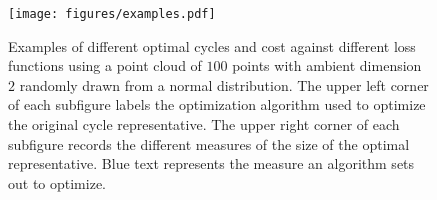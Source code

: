 \begin{landscape}
\begin{figure}[hbt!]
\begin{center}
\texttt{[image: figures/examples.pdf]}
\end{center}
\caption{Examples of different optimal cycles and cost against different loss functions using a point cloud of $100$ points with ambient dimension $2$ randomly drawn from a normal distribution. The upper left corner of each subfigure labels the optimization algorithm used to optimize the original cycle representative. The upper right corner of each subfigure records the different measures of the size of the optimal representative. Blue text represents the measure an algorithm sets out to optimize. 
}\label{fig:Examplesofeachoptimalcycles} 
\end{figure}
\end{landscape}





